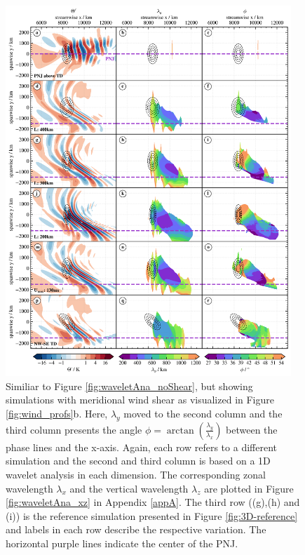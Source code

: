 \begin{figure}[tbp]
    \centering
    \includegraphics[width=0.96\textwidth]{figures_3D/waveletAna_angle.png}
    \caption{Similiar to Figure \ref{fig:waveletAna_noShear}, but showing simulations with meridional wind shear as visualized in Figure \ref{fig:wind_profs}b. Here, $\lambda_y$ moved to the second column and the third column presents the angle $\phi=\arctan(\frac{\lambda_y}{\lambda_x})$ between the phase lines and the x-axis. Again, each row refers to a different simulation and the second and third column is based on a 1D wavelet analysis in each dimension. The corresponding zonal wavelength $\lambda_x$ and the vertical wavelength $\lambda_z$ are plotted in Figure \ref{fig:waveletAna_xz} in Appendix \ref{appA}. The third row ((g),(h) and (i)) is the reference simulation presented in Figure \ref{fig:3D-reference} and labels in each row describe the respective variation. The horizontal purple lines indicate the center of the PNJ.}
    \label{fig:waveletAna}
\end{figure}
